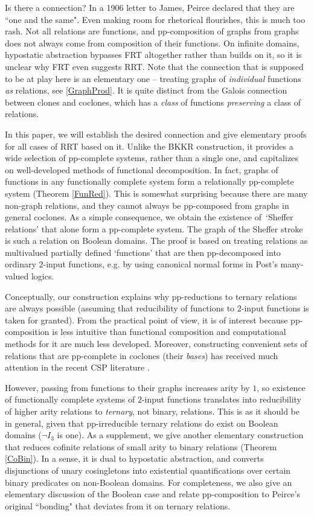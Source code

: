 \documentclass[11pt]{article}
\theoremstyle{plain}
\theoremstyle{definition}
\begin{document}
Is there a connection? In a 1906 letter to James, Peirce declared that they are ``one and the same". Even making room for rhetorical flourishes, this is much too rash. Not all relations are functions, and  pp-composition of graphs from graphs does not always come from composition of their functions. On infinite domains, hypostatic abstraction bypasses FRT altogether rather than builds on it, so it is unclear why FRT even suggests RRT. Note that the connection that is supposed to be at play here is an elementary one -- treating graphs of {\it individual} functions {\it as} relations, see \eqref{GraphProd}. It is quite distinct from the Galois connection between clones and coclones, which has a {\it class} of functions {\it preserving} a class of relations.

In this paper, we will establish the desired connection and give elementary proofs for all cases of RRT based on it. Unlike the BKKR construction, it provides a wide selection of pp-complete systems, rather than a single one, and capitalizes on well-developed methods of functional decomposition. In fact, graphs of functions in any functionally complete system form a relationally pp-complete system (Theorem \ref{FunRed}). This is somewhat surprising because there are many non-graph relations, and they cannot always be pp-composed from graphs in general coclones. As a simple consequence, we obtain the existence of\, `Sheffer relations' that alone form a pp-complete system. The graph of the Sheffer stroke is such a relation on Boolean domains. The proof is based on treating relations as multivalued partially defined `functions' that are then pp-decomposed into ordinary 2-input functions, e.g. by using canonical normal forms in Post's many-valued logics. 

Conceptually, our construction  explains why pp-reductions to ternary relations are always possible (assuming that reducibility of functions to $2$-input functions is taken for granted). From the practical point of view, it is of interest because pp-composition is less intuitive than functional composition and computational methods for it are much less developed. Moreover, constructing convenient sets of relations that are pp-complete in coclones (their {\it bases}) has received much attention in the recent CSP literature \cite{BRSV05,Lag17}.

However, passing from functions to their graphs increases arity by $1$, so existence of functionally complete systems of $2$-input functions translates into reducibility of higher arity relations to {\it ternary}, not binary, relations. This is as it should be in general, given that pp-irreducible ternary relations do exist on Boolean domains ($\neg I_3$ is one). As a supplement, we give another elementary construction that reduces cofinite relations of small arity to binary relations (Theorem \ref{CoBin}). In a sense, it is dual to hypostatic abstraction, and converts disjunctions of unary cosingletons into existential quantifications over certain binary predicates on non-Boolean domains. For completeness, we also give an elementary discussion of the Boolean case and relate pp-composition to Peirce's original ``bonding" that deviates from it on ternary relations.
\end{document}
